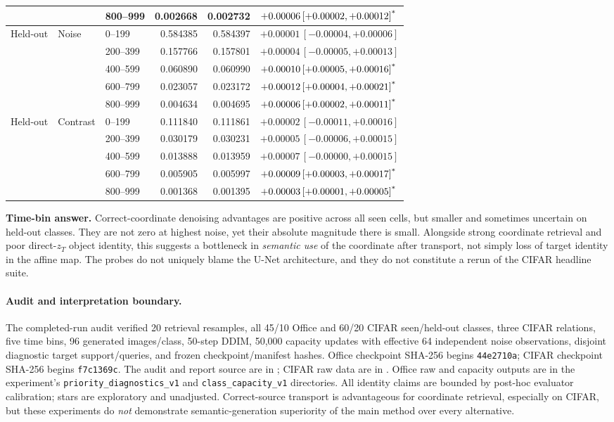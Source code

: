 \documentclass[10pt]{article}
\newcommand{\sig}{\textsuperscript{*}}
\begin{document}
\begin{longtable}{lllrrl}
 & & 800--999 & 0.002668 & 0.002732 & $+0.00006\,[+0.00002,+0.00012]\sig$\\
\midrule
Held-out & Noise & 0--199 & 0.584385 & 0.584397 & $+0.00001\,[-0.00004,+0.00006]$\\
 & & 200--399 & 0.157766 & 0.157801 & $+0.00004\,[-0.00005,+0.00013]$\\
 & & 400--599 & 0.060890 & 0.060990 & $+0.00010\,[+0.00005,+0.00016]\sig$\\
 & & 600--799 & 0.023057 & 0.023172 & $+0.00012\,[+0.00004,+0.00021]\sig$\\
 & & 800--999 & 0.004634 & 0.004695 & $+0.00006\,[+0.00002,+0.00011]\sig$\\
\midrule
Held-out & Contrast & 0--199 & 0.111840 & 0.111861 & $+0.00002\,[-0.00011,+0.00016]$\\
 & & 200--399 & 0.030179 & 0.030231 & $+0.00005\,[-0.00006,+0.00015]$\\
 & & 400--599 & 0.013888 & 0.013959 & $+0.00007\,[-0.00000,+0.00015]$\\
 & & 600--799 & 0.005905 & 0.005997 & $+0.00009\,[+0.00003,+0.00017]\sig$\\
 & & 800--999 & 0.001368 & 0.001395 & $+0.00003\,[+0.00001,+0.00005]\sig$\\
\bottomrule
\end{longtable}
\normalsize

\textbf{Time-bin answer.} Correct-coordinate denoising advantages are positive across all seen cells, but smaller and sometimes uncertain on held-out classes. They are not zero at highest noise, yet their absolute magnitude there is small. Alongside strong coordinate retrieval and poor direct-$z_T$ object identity, this suggests a bottleneck in \emph{semantic use} of the coordinate after transport, not simply loss of target identity in the affine map. The probes do not uniquely blame the U-Net architecture, and they do not constitute a rerun of the CIFAR headline suite.

\paragraph{Audit and interpretation boundary.}
The completed-run audit verified 20 retrieval resamples, all 45/10 Office and 60/20 CIFAR seen/held-out classes, three CIFAR relations, five time bins, 96 generated images/class, 50-step DDIM, 50{,}000 capacity updates with effective 64 independent noise observations, disjoint diagnostic target support/queries, and frozen checkpoint/manifest hashes. Office checkpoint SHA-256 begins \texttt{44e2710a}; CIFAR checkpoint SHA-256 begins \texttt{f7c1369c}. The audit and report source are in ; CIFAR raw data are in . Office raw and capacity outputs are in the experiment's \texttt{priority\_diagnostics\_v1} and \texttt{class\_capacity\_v1} directories. All identity claims are bounded by post-hoc evaluator calibration; stars are exploratory and unadjusted. Correct-source transport is advantageous for coordinate retrieval, especially on CIFAR, but these experiments do \emph{not} demonstrate semantic-generation superiority of the main method over every alternative.
\end{document}
